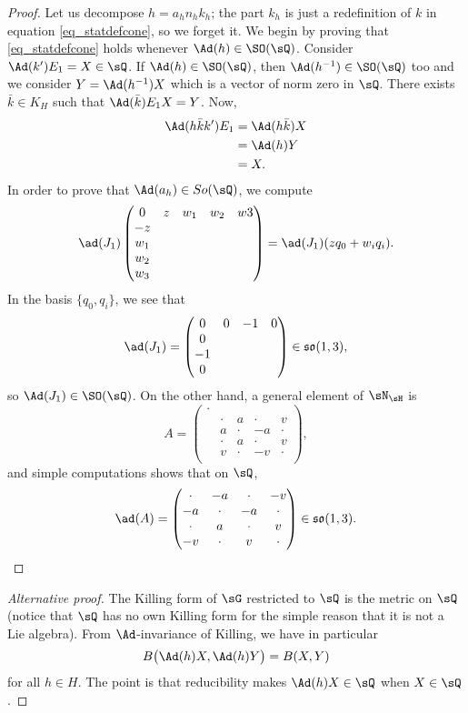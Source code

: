 \begin{proof}
Let us decompose $h=a_hn_hk_h$; the part $k_h$ is just a redefinition of $k$ in equation \eqref{eq_statdefcone}, so we forget it. We begin by proving that \eqref{eq_statdefcone} holds whenever $\Ad(h)\in \SO(\sQ)$. Consider $\Ad(k')E_1=X\in\sQ$. If $\Ad(h)\in \SO(\sQ)$, then $\Ad(h^{-1})\in \SO(\sQ)$ too and we consider $Y=\Ad(h^{-1})X$ which is a vector of norm zero in $\sQ$. There exists $\bar k\in K_H$ such that $\Ad(\bar k)E_1X=Y$. Now,
\begin{equation}
\begin{split}
\Ad(h\bar kk')E_1&=\Ad(h\bar k)X\\
		&=\Ad(h)Y\\
		&=X.
\end{split}
\end{equation}
In order to prove that $\Ad(a_h)\in So(\sQ)$, we compute
\[ 
  \ad(J_1)\begin{pmatrix}
0	& z	& w_1	& w_2	& w3\\
-z\\
w_1\\
w_2\\
w_3
\end{pmatrix}
=\ad(J_1)(zq_0+w_iq_i).
\]
In the basis $\{ q_0,q_i \}$, we see that
\[ 
  \ad(J_1)=\begin{pmatrix}
0&0&-1&0\\
0\\-1\\0
\end{pmatrix}\in\mathfrak{so}(1,3),
\]
so $\Ad(J_1)\in \SO(\sQ)$. On the other hand, a general element of $\sN_{\sH}$ is
\[ 
  A=\begin{pmatrix}
\cdot\\
&\cdot& a&\cdot& v\\
&a&\cdot &-a&\cdot\\
&  \cdot& a&\cdot& v\\
&v&\cdot&-v&\cdot\\
\end{pmatrix},
\]
and simple computations shows that on $\sQ$,
\[ 
  \ad(A)=\begin{pmatrix}
\cdot &-a&\cdot&-v\\
-a&\cdot&-a&\cdot\\
\cdot&a&\cdot &v\\
-v&\cdot&v&\cdot
\end{pmatrix}\in\mathfrak{so}(1,3).
\]
\end{proof}

\begin{proof}[Alternative proof]
The Killing form of $\sG$ restricted to $\sQ$ is the metric on $\sQ$ (notice that $\sQ$ has no own Killing form for the simple reason that it is not a Lie algebra). From $\Ad$-invariance of Killing, we have in particular
\[ 
  B\big( \Ad(h)X,\Ad(h)Y \big)=B(X,Y)
\]
for all $h\in H$. The point is that reducibility makes $\Ad(h)X\in\sQ$ when $X\in\sQ$.
\end{proof}


